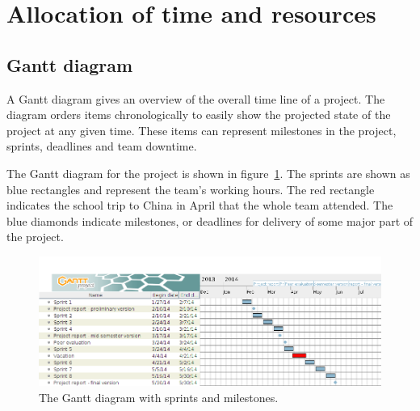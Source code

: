 \section{Allocation of time and resources}

\subsection{Gantt diagram}
\label{sec:gantt}

A Gantt diagram gives an overview of the overall time line of a project. The diagram orders items chronologically to easily show the projected state of the project at any given time. These items can represent milestones in the project, sprints, deadlines and team downtime. 

The Gantt diagram for the project is shown in figure~\ref{fig:gantt}. The sprints are shown as blue rectangles and represent the team's working hours. The red rectangle indicates the school trip to China in April that the whole team attended. The blue diamonds indicate milestones, or deadlines for delivery of some major part of the project.


\begin{figure}[H]
\includegraphics[width=\textwidth]{ch/prestudy/fig/gantt.png}
\caption{The Gantt diagram with sprints and milestones.}
\label{fig:gantt}
\end{figure}
